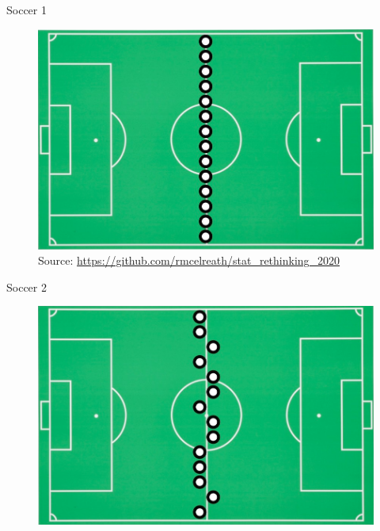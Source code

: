 \documentclass[handout]{beamer}
\begin{document}
\begin{frame}{Soccer 1}
 \begin{figure}[h!]
	\centering
	\includegraphics[scale=0.3]{pics/soccer1.png}
	\caption{Source: \url{https://github.com/rmcelreath/stat_rethinking_2020}}
\end{figure}


\end{frame}


\begin{frame}{Soccer 2}
 \begin{figure}[h!]
	\centering
	\includegraphics[scale=0.3]{pics/soccer2.png}
\end{figure}


\end{frame}
\end{document}

